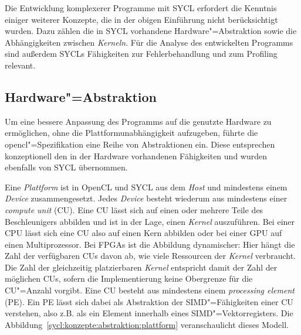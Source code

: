 Die Entwicklung komplexerer Programme mit SYCL erfordert die Kenntnis einiger
weiterer Konzepte, die in der obigen Einführung nicht berücksichtigt wurden.
Dazu zählen die in SYCL vorhandene Hardware"=Abstraktion sowie die
Abhängigkeiten zwischen \textit{Kerneln}. Für die Analyse des entwickelten
Programms sind außerdem SYCLs Fähigkeiten zur Fehlerbehandlung und zum Profiling
relevant.

\subsection{Hardware"=Abstraktion}

Um eine bessere Anpassung des Programms auf die genutzte Hardware zu
ermöglichen, ohne die Plattformunabhängigkeit aufzugeben, führte die
\gls{opencl}"=Spezifikation eine Reihe von Abstraktionen ein. Diese entsprechen
konzeptionell den in der Hardware vorhandenen Fähigkeiten und wurden ebenfalls
von SYCL übernommen.

Eine \textit{Plattform} ist in OpenCL und SYCL aus dem \textit{Host} und
mindestens einem \textit{Device} zusammengesetzt. Jedes \textit{Device} besteht
wiederum aus mindestens einer \textit{compute unit} (CU). Eine CU lässt sich auf
einen oder mehrere Teile des Beschleunigers abbilden und ist in der Lage, einen
\textit{Kernel} auszuführen. Bei einer CPU lässt sich eine CU also auf einen
Kern abbilden oder bei einer GPU auf einen Multiprozessor. Bei FPGAs ist die
Abbildung dynamischer: Hier hängt die Zahl der verfügbaren CUs davon ab, wie
viele Ressourcen der \textit{Kernel} verbraucht. Die Zahl der gleichzeitig
platzierbaren \textit{Kernel} entspricht damit der Zahl der möglichen CUs,
sofern die Implementierung keine Obergrenze für die CU"=Anzahl vorgibt. Eine CU
besteht aus mindestens einem \textit{processing element} (PE). Ein PE lässt sich
dabei als Abstraktion der SIMD"=Fähigkeiten einer CU verstehen, also z.B. als
ein Element innerhalb eines SIMD"=Vektorregisters.
Die Abbildung~\ref{sycl:konzepte:abstraktion:plattform} veranschaulicht dieses
Modell.


